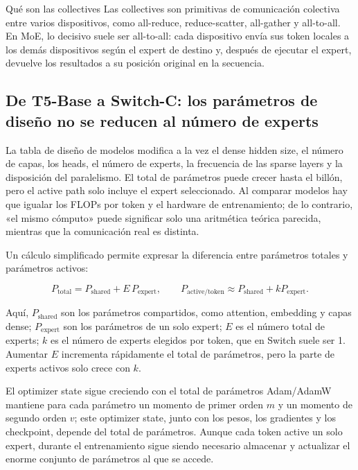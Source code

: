 \begin{importantbox}{Qué son las collectives}
Las collectives son primitivas de comunicación colectiva entre varios dispositivos, como all-reduce, reduce-scatter, all-gather y all-to-all. En MoE, lo decisivo suele ser all-to-all: cada dispositivo envía sus token locales a los demás dispositivos según el expert de destino y, después de ejecutar el expert, devuelve los resultados a su posición original en la secuencia.
\end{importantbox}

\subsection{De T5-Base a Switch-C: los parámetros de diseño no se reducen al número de experts}

La tabla de diseño de modelos modifica a la vez el dense hidden size, el número de capas, los heads, el número de experts, la frecuencia de las sparse layers y la disposición del paralelismo. El total de parámetros puede crecer hasta el billón, pero el active path solo incluye el expert seleccionado. Al comparar modelos hay que igualar los FLOPs por token y el hardware de entrenamiento; de lo contrario, «el mismo cómputo» puede significar solo una aritmética teórica parecida, mientras que la comunicación real es distinta.


Un cálculo simplificado permite expresar la diferencia entre parámetros totales y parámetros activos:

\[
P_{\text{total}}=P_{\text{shared}}+E\,P_{\text{expert}},
\qquad
P_{\text{active/token}}\approx P_{\text{shared}}+kP_{\text{expert}}.
\]

Aquí, $P_{\text{shared}}$ son los parámetros compartidos, como attention, embedding y capas dense; $P_{\text{expert}}$ son los parámetros de un solo expert; $E$ es el número total de experts; $k$ es el número de experts elegidos por token, que en Switch suele ser 1. Aumentar $E$ incrementa rápidamente el total de parámetros, pero la parte de experts activos solo crece con $k$.

\begin{warningbox}{El optimizer state sigue creciendo con el total de parámetros}
Adam/AdamW mantiene para cada parámetro un momento de primer orden $m$ y un momento de segundo orden $v$; este optimizer state, junto con los pesos, los gradientes y los checkpoint, depende del total de parámetros. Aunque cada token active un solo expert, durante el entrenamiento sigue siendo necesario almacenar y actualizar el enorme conjunto de parámetros al que se accede.
\end{warningbox}

